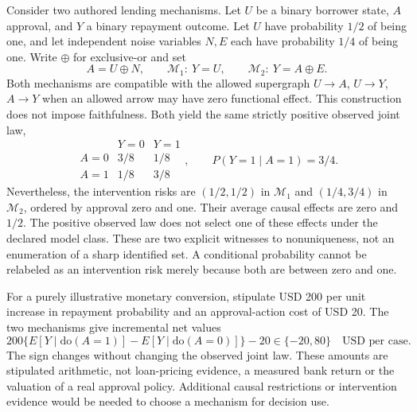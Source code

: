 Consider two authored lending mechanisms. Let $U$ be a binary borrower state,
$A$ approval, and $Y$ a binary repayment outcome. Let $U$ have probability
$1/2$ of being one, and let independent noise variables $N,E$ each have
probability $1/4$ of being one. Write $\oplus$ for exclusive-or and set
\begin{equation}
 A=U\oplus N,\qquad
 \mathcal M_1:\ Y=U,\qquad
 \mathcal M_2:\ Y=A\oplus E.
 \label{exec19:javaid-models}
\end{equation}
Both mechanisms are compatible with the allowed supergraph
$U\to A$, $U\to Y$, $A\to Y$ when an allowed arrow may have zero functional
effect. This construction does not impose faithfulness. Both yield the same
strictly positive observed joint law,
\begin{equation}
 \begin{array}{c|cc}
  &Y=0&Y=1\\\hline
 A=0&3/8&1/8\\
 A=1&1/8&3/8
 \end{array},
 \qquad P(Y=1\mid A=1)=3/4.
 \label{exec19:javaid-law}
\end{equation}
Nevertheless, the intervention risks are $(1/2,1/2)$ in $\mathcal M_1$ and
$(1/4,3/4)$ in $\mathcal M_2$, ordered by approval zero and one. Their average
causal effects are zero and $1/2$. The positive observed law does not select
one of these effects under the declared model class. These are two explicit
witnesses to nonuniqueness, not an enumeration of a sharp identified set. A
conditional probability cannot be relabeled as an intervention risk merely
because both are between zero and one.\citep{exec19_javaid_reference}

For a purely illustrative monetary conversion, stipulate USD 200 per unit
increase in repayment probability and an approval-action cost of USD 20. The
two mechanisms give incremental net values
\begin{equation}
 200\{E[Y\mid\mathrm{do}(A=1)]-E[Y\mid\mathrm{do}(A=0)]\}-20
 \in\{-20,80\}\quad\text{USD per case}.
 \label{exec19:javaid-money}
\end{equation}
The sign changes without changing the observed joint law. These amounts are
stipulated arithmetic, not loan-pricing evidence, a measured bank return or
the valuation of a real approval policy. Additional causal restrictions or
intervention evidence would be needed to choose a mechanism for decision use.
\citep{exec19_javaid_reference}

